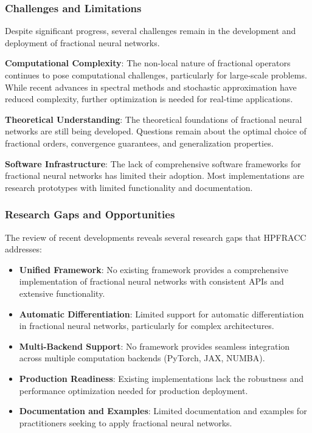 \subsubsection{Challenges and Limitations}

Despite significant progress, several challenges remain in the development and deployment of fractional neural networks.

\textbf{Computational Complexity}: The non-local nature of fractional operators continues to pose computational challenges, particularly for large-scale problems. While recent advances in spectral methods and stochastic approximation have reduced complexity, further optimization is needed for real-time applications.

\textbf{Theoretical Understanding}: The theoretical foundations of fractional neural networks are still being developed. Questions remain about the optimal choice of fractional orders, convergence guarantees, and generalization properties.

\textbf{Software Infrastructure}: The lack of comprehensive software frameworks for fractional neural networks has limited their adoption. Most implementations are research prototypes with limited functionality and documentation.

\subsubsection{Research Gaps and Opportunities}

The review of recent developments reveals several research gaps that HPFRACC addresses:

\begin{itemize}
    \item \textbf{Unified Framework}: No existing framework provides a comprehensive implementation of fractional neural networks with consistent APIs and extensive functionality.
    \item \textbf{Automatic Differentiation}: Limited support for automatic differentiation in fractional neural networks, particularly for complex architectures.
    \item \textbf{Multi-Backend Support}: No framework provides seamless integration across multiple computation backends (PyTorch, JAX, NUMBA).
    \item \textbf{Production Readiness}: Existing implementations lack the robustness and performance optimization needed for production deployment.
    \item \textbf{Documentation and Examples}: Limited documentation and examples for practitioners seeking to apply fractional neural networks.
\end{itemize}

